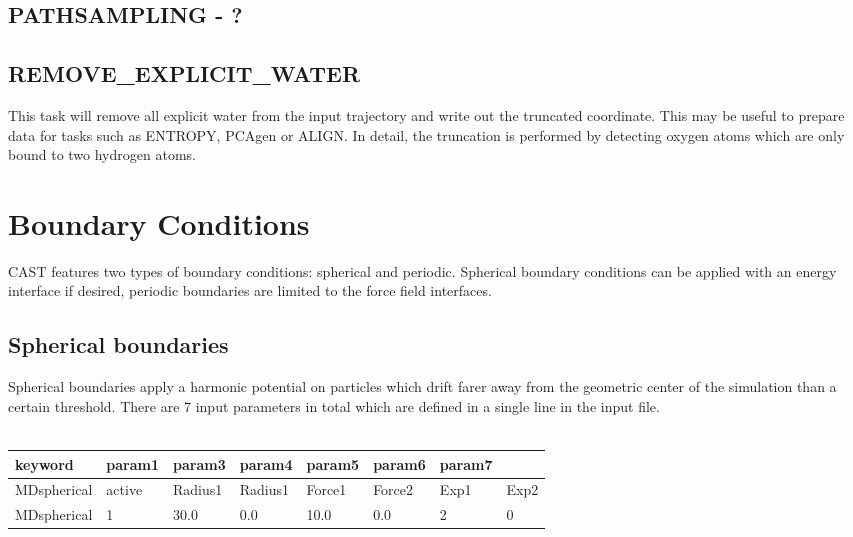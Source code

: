 \documentclass[10pt,a4paper]{article} %
\newif\ifdevmode %
\begin{document}
	\subsection{PATHSAMPLING - ?}	
	\ifdevmode \colorbox{red}{write something here} \fi	
	
	\subsection{REMOVE\_EXPLICIT\_WATER}	
	This task will remove all explicit water from the input trajectory and write out the truncated coordinate. This may be useful to prepare data for tasks such as ENTROPY, PCAgen or ALIGN. In detail, the truncation is performed by detecting oxygen atoms which are only bound to two hydrogen atoms.\\
		

	\section{Boundary Conditions}
	\label{sec:boundary}
	\ac{CAST} features two types of boundary conditions: spherical and periodic. Spherical boundary conditions can be applied with an energy interface if desired, periodic boundaries are limited to the force field interfaces.

	\subsection{Spherical boundaries}
	Spherical boundaries apply a harmonic potential on particles which drift farer away from the geometric center of the simulation than a certain threshold. There are 7 input parameters in total which are defined in a single line in the input file. \\~\\

	\begin{tabularx}{\textwidth}{l|X|X|X|X|X|X|X}
		keyword & param1 & param3 & param4 & param5 & param6 & param7 \\
		\hline
		MDspherical & active & Radius1 & Radius1 & Force1 & Force2 & Exp1 & Exp2 \\
		MDspherical & 1 & 30.0 & 0.0 & 10.0 & 0.0 & 2 & 0 \\
	\end{tabularx}~\\
\end{document}
